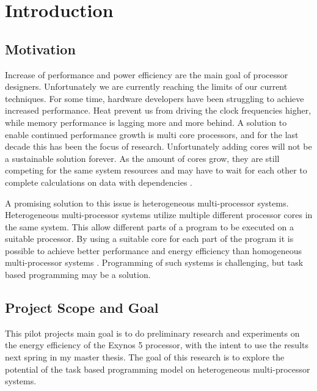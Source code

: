 \chapter[Introduction]{Introduction}
\section{Motivation}
Increase of performance and power efficiency are the main goal of processor designers.
Unfortunately we are currently reaching the limits of our current techniques.
For some time, hardware developers have been struggling to achieve increased performance.
Heat prevent us from driving the clock frequencies higher, while memory performance is lagging more and more behind.
A solution to enable continued performance growth is multi core processors, and for the last decade this has been the focus of research.
Unfortunately adding cores will not be a sustainable solution forever.
As the amount of cores grow, they are still competing for the same system resources and may have to wait for each other to complete calculations on data with dependencies \cite{hill07}.

A promising solution to this issue is heterogeneous multi-processor systems.
Heterogeneous multi-processor systems utilize multiple different processor cores in the same system.
This allow different parts of a program to be executed on a suitable processor.
By using a suitable core for each part of the program it is possible to achieve better performance and energy efficiency than homogeneous multi-processor systems \cite{kumar03}.
Programming of such systems is challenging, but task based programming may be a solution.

\section{Project Scope and Goal}
This pilot projects main goal is to do preliminary research and experiments on the energy efficiency of the Exynos 5 processor, with the intent to use the results next spring in my master thesis.
The goal of this research is to explore the potential of the task based programming model on heterogeneous multi-processor systems.

